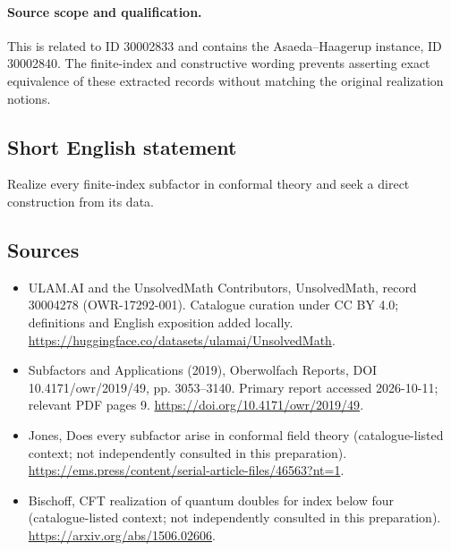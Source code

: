\documentclass[11pt]{article}
\begin{document}
\paragraph{Source scope and qualification.}
This is related to ID 30002833 and contains the Asaeda--Haagerup instance, ID 30002840. The finite-index and constructive wording prevents asserting exact equivalence of these extracted records without matching the original realization notions.
\subsection{Short English statement}
Realize every finite-index subfactor in conformal theory and seek a direct construction from its data.
\subsection{Sources}
\begin{itemize}
\item[\hypertarget{source:30004278:1}{S1}] ULAM.AI and the UnsolvedMath Contributors, UnsolvedMath, record 30004278 (OWR-17292-001). Catalogue curation under CC BY 4.0; definitions and English exposition added locally.
\url{https://huggingface.co/datasets/ulamai/UnsolvedMath}.
\item[\hypertarget{source:30004278:2}{S2}] Subfactors and Applications (2019), Oberwolfach Reports, DOI 10.4171/owr/2019/49, pp. 3053--3140. Primary report accessed 2026-10-11; relevant PDF pages 9.
\url{https://doi.org/10.4171/owr/2019/49}.
\item[\hypertarget{source:30004278:3}{S3}] Jones, Does every subfactor arise in conformal field theory (catalogue-listed context; not independently consulted in this preparation).
\url{https://ems.press/content/serial-article-files/46563?nt=1}.
\item[\hypertarget{source:30004278:4}{S4}] Bischoff, CFT realization of quantum doubles for index below four (catalogue-listed context; not independently consulted in this preparation).
\url{https://arxiv.org/abs/1506.02606}.
\end{itemize}
\label{end:30004278}
\end{document}
